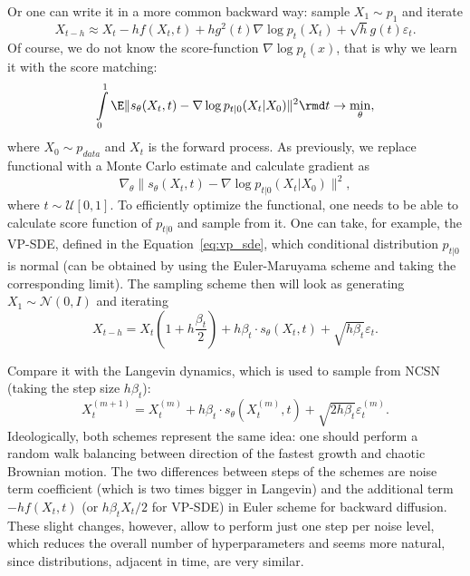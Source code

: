 Or one can write it in a more common backward way: sample $X_1 \sim p_1$ and iterate
\[
    X_{t - h} \approx X_t - h f(X_t, t) + h g^2(t) \nabla \log p_t(X_t) + \sqrt{h} g(t) \varepsilon_t.
\]
Of course, we do not know the score-function $\nabla \log p_t(x)$, that is why we learn it with the score matching:
\begin{equation}\label{eq:continuous_score_matching}
    \int\limits_{0}^{1} \E \| s_\theta(X_t, t) - \nabla \log p_{t | 0}(X_t | X_0) \|^2 \rmd t \rightarrow \min\limits_{\theta},
\end{equation}
where $X_0 \sim p_{data}$ and $X_t$ is the forward process. As previously, we replace functional with a Monte Carlo estimate and calculate gradient as
\[
    \nabla_{\theta} \|s_\theta(X_t, t) - \nabla \log p_{t | 0}(X_t | X_0) \|^2,
\]
where $t \sim \mathcal{U}[0, 1]$. To efficiently optimize the functional, one needs to be able to calculate score function of $p_{t | 0}$ and sample from it. One can take, for example, the VP-SDE, defined in the Equation~\ref{eq:vp_sde}, which conditional distribution $p_{t | 0}$ is normal (can be obtained by using the Euler-Maruyama scheme and taking the corresponding limit). The sampling scheme then will look as generating $X_1 \sim \mathcal{N}(0, I)$ and iterating
\[
    X_{t - h} = X_t\left(1 + h \frac{\beta_t}{2}\right) + h \beta_t \cdot  s_\theta(X_t, t) + \sqrt{h \beta_t} \varepsilon_t.
\]

Compare it with the Langevin dynamics, which is used to sample from NCSN (taking the step size $h \beta_t$):
\[
    X_t^{(m + 1)} = X_t^{(m)} + h \beta_t \cdot s_\theta(X_t^{(m)}, t) + \sqrt{2 h \beta_t} \varepsilon_t^{(m)}.
\]
Ideologically, both schemes represent the same idea: one should perform a random walk balancing between direction of the fastest growth and chaotic Brownian motion. The two differences between steps of the schemes are noise term coefficient (which is two times bigger in Langevin) and the additional term $-h f(X_t, t)$ (or $h \beta_t X_t / 2$ for VP-SDE) in Euler scheme for backward diffusion. These slight changes, however, allow to perform just one step per noise level, which reduces the overall number of hyperparameters and seems more natural, since distributions, adjacent in time, are very similar.

